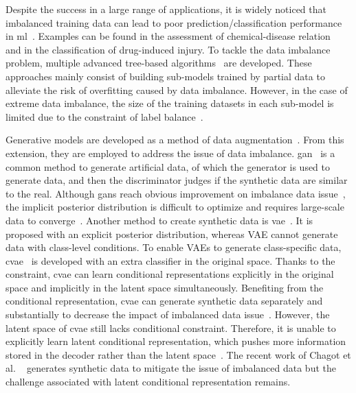 \documentclass[twoside,twocolumn,9pt]{article}
\begin{document}
Despite the success in a large range of applications, it is widely noticed that imbalanced training data can lead to poor prediction/classification performance in \acrshort*{ml}~\cite{he2009learning}. Examples can be found  in the assessment of chemical-disease relation~\cite{mitra2020multi} and in the classification of drug-induced injury\cite{thakkar2018liver}. To tackle the data imbalance problem, multiple advanced tree-based algorithms~\cite{su2015improving,blaszczynski2015neighbourhood,bader2018biased,ferreira2019adaptive} are developed. These approaches mainly consist of building sub-models trained by partial data to alleviate the risk of overfitting caused by data imbalance. However, in the case of extreme data imbalance, the size of the training datasets in each sub-model is limited due to the constraint of label balance~\cite{batista2004study}. 

Generative models are developed as a method of data augmentation~\cite{wei2019eda}. From this extension, they are employed to address the issue of data imbalance. \acrfull*{gan}~\cite{goodfellow2020generative} is a common method to generate artificial data, of which the generator is used to generate data, and then the discriminator judges if the synthetic data are similar to the real. Although \acrshort*{gan}s reach obvious improvement on imbalance data issue~\cite{moon2020conditional}, the implicit posterior distribution is difficult to optimize and requires large-scale data to converge~\cite{burks2019data}. Another method to create synthetic data is \acrfull*{vae}~\cite{kingma2014auto}. It is proposed with an explicit posterior distribution, whereas VAE cannot generate data with class-level conditions. To enable VAEs to generate class-specific data, \acrfull*{cvae}~\cite{sohn2015learning} is developed with an extra classifier in the original space. Thanks to the constraint, \acrshort*{cvae} can learn conditional representations explicitly in the original space and implicitly in the latent space simultaneously. Benefiting from the conditional representation, \acrshort*{cvae} can generate synthetic data separately and substantially to decrease the impact of imbalanced data issue~\cite{huang2022ada,chen2021trajvae,yang2019improving}. However, the latent space of \acrshort*{cvae} still lacks conditional constraint. Therefore, it is unable to explicitly learn latent conditional representation, which pushes more information stored in the decoder rather than the latent space~\cite{he2022masked}. The recent work of Chagot et al. ~\cite{chagot2022surfactant} generates synthetic data to mitigate the issue of imbalanced data but the challenge associated with latent conditional representation remains. %
\end{document}
